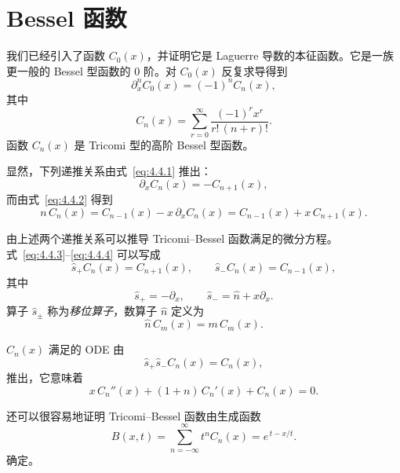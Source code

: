 \section{Bessel 函数}

我们已经引入了函数 $C_0(x)$，并证明它是 Laguerre 导数的本征函数。它是一族更一般的 Bessel 型函数的 0 阶。对 $C_0(x)$ 反复求导得到
\begin{equation}
\partial_x^n C_0(x) = (-1)^n C_n(x),
\label{eq:4.4.1}
\end{equation}
其中
\begin{equation}
C_n(x) = \sum_{r=0}^{\infty} \frac{(-1)^r x^r}{r!\,(n+r)!}.
\label{eq:4.4.2}
\end{equation}
函数 $C_n(x)$ 是 Tricomi 型的高阶 Bessel 型函数。

显然，下列递推关系由式~\eqref{eq:4.4.1} 推出：
\begin{equation}
\partial_x C_n(x) = -C_{n+1}(x),
\label{eq:4.4.3}
\end{equation}
而由式~\eqref{eq:4.4.2} 得到
\begin{equation}
n\,C_n(x) = C_{n-1}(x) - x\,\partial_x C_n(x)
= C_{n-1}(x) + x\,C_{n+1}(x).
\label{eq:4.4.4}
\end{equation}

由上述两个递推关系可以推导 Tricomi--Bessel 函数满足的微分方程。式~\eqref{eq:4.4.3}--\eqref{eq:4.4.4} 可以写成
\begin{equation}
\hat s_+ C_n(x) = C_{n+1}(x),
\qquad
\hat s_- C_n(x) = C_{n-1}(x),
\label{eq:4.4.5}
\end{equation}
其中
\begin{equation}
\hat s_+ = -\partial_x,
\qquad
\hat s_- = \hat n + x\partial_x.
\label{eq:4.4.6}
\end{equation}
算子 $\hat s_\pm$ 称为\emph{移位算子}，数算子 $\hat n$ 定义为
\begin{equation}
\hat n\,C_m(x) = m\,C_m(x).
\label{eq:4.4.7}
\end{equation}

$C_n(x)$ 满足的 ODE 由
\begin{equation}
\hat s_+ \hat s_- C_n(x) = C_n(x),
\label{eq:4.4.8}
\end{equation}
推出，它意味着
\begin{equation}
x\,C_n''(x) + (1+n)\,C_n'(x) + C_n(x) = 0.
\label{eq:4.4.9}
\end{equation}

还可以很容易地证明 Tricomi--Bessel 函数由生成函数
\begin{equation}
B(x,t) = \sum_{n=-\infty}^{\infty} t^n C_n(x)
= e^{\,t - x/t}.
\label{eq:4.4.10}
\end{equation}
确定。

